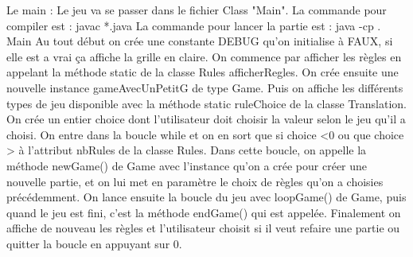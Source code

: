 Le main : Le jeu va se passer dans le fichier Class "Main".
La commande pour compiler est : javac *.java
La commande pour lancer la partie est : java -cp . Main
Au tout début on crée une constante DEBUG qu'on initialise à FAUX, si elle est a vrai ça affiche la grille en claire.
On commence par afficher les règles en appelant la méthode static de la classe Rules
afficherRegles.
On crée ensuite une nouvelle instance gameAvecUnPetitG  de type Game.
Puis on affiche les différents types de jeu disponible avec la méthode static ruleChoice
de la classe Translation.
On crée un entier choice dont l'utilisateur doit choisir la valeur selon le jeu qu'il a choisi.
On entre dans la boucle while et on en sort que si choice <0 ou que choice > à l'attribut nbRules
de la classe Rules.
Dans cette boucle, on appelle la méthode newGame() de Game avec l'instance qu'on a crée pour créer une nouvelle partie, et on lui met en paramètre le choix de règles qu'on a choisies précédemment.
On lance ensuite la boucle du jeu avec loopGame() de Game, puis quand le jeu est fini, c'est la méthode endGame() qui est appelée.
Finalement on affiche de nouveau les règles et l'utilisateur choisit si il veut refaire une partie ou quitter la boucle en appuyant sur 0.